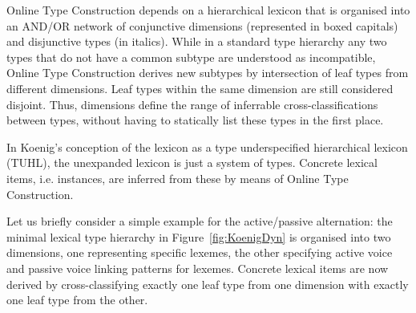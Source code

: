 \documentclass[output=paper
	        ,collection
	        ,collectionchapter
 	        ,biblatex
                ,babelshorthands
                ,newtxmath
                ,draftmode
                ,colorlinks, citecolor=brown
]{langscibook}
\begin{document}
Online Type Construction depends on a hierarchical lexicon that is
organised into an AND/OR network of conjunctive dimensions
(represented in boxed capitals) and disjunctive types (in
italics). While in a standard type hierarchy any two types that do not
have a common subtype are understood as incompatible, Online Type
Construction derives new subtypes by intersection of leaf types from
different dimensions. Leaf types within the same dimension are still
considered disjoint. Thus, dimensions define the range of inferrable
cross-classifications between types, without having to statically list
these types in the first place.

In Koenig's conception of the lexicon as a type underspecified
hierarchical lexicon (TUHL), the unexpanded lexicon is just a system of
types. Concrete lexical items, i.e. instances, are inferred from these
by means of Online Type Construction. 

Let us briefly consider a simple example for the active/passive
alternation: the minimal lexical type hierarchy in
Figure~\ref{fig:KoenigDyn} is organised into two
dimensions, one representing specific lexemes, the other specifying
active voice and passive voice linking patterns for lexemes. Concrete
lexical items are now derived by cross-classifying exactly one leaf
type from one dimension with exactly one leaf type from the other.
\end{document}
